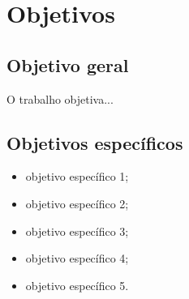 \section*{Objetivos}

    \subsection*{Objetivo geral}
	O trabalho objetiva...


    \subsection*{Objetivos específicos}
    	\begin{itemize}
    	    \item objetivo específico 1;
            \item objetivo específico 2;
            \item objetivo específico 3;
            \item objetivo específico 4;
            \item objetivo específico 5.

    	\end{itemize}